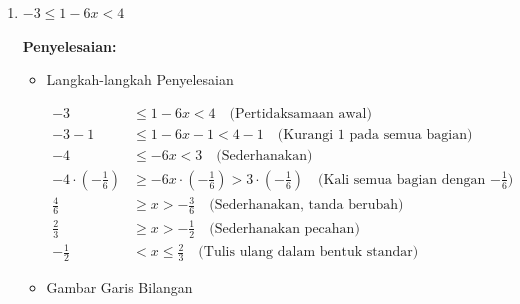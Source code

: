 \documentclass{article}
\begin{document}
\begin{enumerate}
\begin{itemize}
    \item HP: $(1, \infty)$
    \end{itemize}
    
    \item $-3 \le 1-6x < 4$
    
    \textbf{Penyelesaian:}
    
    \begin{itemize}
    \item Langkah-langkah Penyelesaian
    
    \begin{align}
    -3 &\leq 1-6x < 4 \quad \text{(Pertidaksamaan awal)} \\
    -3 - 1 &\leq 1-6x - 1 < 4 - 1 \quad \text{(Kurangi 1 pada semua bagian)} \\
    -4 &\leq -6x < 3 \quad \text{(Sederhanakan)} \\
    -4 \cdot \left(-\frac{1}{6}\right) &\geq -6x \cdot \left(-\frac{1}{6}\right) > 3 \cdot \left(-\frac{1}{6}\right) \quad \text{(Kali semua bagian dengan $-\frac{1}{6}$)} \\
    \frac{4}{6} &\geq x > -\frac{3}{6} \quad \text{(Sederhanakan, tanda berubah)} \\
    \frac{2}{3} &\geq x > -\frac{1}{2} \quad \text{(Sederhanakan pecahan)} \\
    -\frac{1}{2} &< x \leq \frac{2}{3} \quad \text{(Tulis ulang dalam bentuk standar)}
    \end{align}
    
    \item Gambar Garis Bilangan
    
    \begin{center}
\end{center}
\end{itemize}
\end{enumerate}
\end{document}
